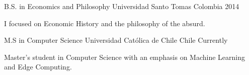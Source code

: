 

\begin{cventries}

  \cventry
    {B.S. in Economics and Philosophy} %
    {Universidad Santo Tomas} %
    {Colombia} %
    {2014} %
    {
      \begin{cvitems} %
        \item {I focused on Economic History and the philosophy of the absurd.}
      \end{cvitems}
    }

  \cventry
    {M.S in Computer Science} %
    {Universidad Católica de Chile} %
    {Chile} %
    {Currently} %
    {
      \begin{cvitems} %
        \item {Master's student in Computer Science with an emphasis on Machine Learning and Edge Computing.}
      \end{cvitems}
    }


\end{cventries}
